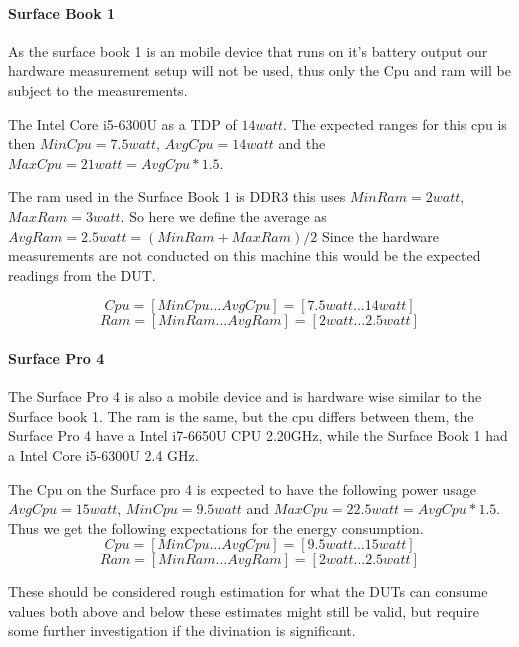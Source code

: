 \paragraph{Surface Book 1}
As the surface book 1 is an mobile device that runs on it's battery output our hardware measurement setup will not be used, thus only the Cpu and ram will be subject to the measurements.

The Intel Core i5-6300U as a TDP of $14 watt$. The expected ranges for this cpu is then $MinCpu = 7.5 watt$, $AvgCpu = 14 watt$ and the $MaxCpu = 21 watt = AvgCpu*1.5$.

The ram used in the Surface Book 1 is DDR3 this uses $MinRam = 2 watt$, $MaxRam = 3 watt$. So here we define the average as $AvgRam =2.5 watt= (MinRam+MaxRam)/2$
Since the hardware measurements are not conducted on this machine this would be the expected readings from the DUT.

$$Cpu = [MinCpu \dotsc AvgCpu] = [7.5 watt \dotsc 14 watt]$$
$$Ram = [MinRam \dotsc AvgRam] = [2 watt \dotsc 2.5 watt]$$

\paragraph{Surface Pro 4}

The Surface Pro 4 is also a mobile device and is hardware wise similar to the Surface book 1. The ram is the same, but the cpu differs between them, the Surface Pro 4 have a Intel i7-6650U CPU 2.20GHz, while the Surface Book 1 had a Intel Core i5-6300U 2.4 GHz.

The Cpu on the Surface pro 4 is expected to have the following power usage $AvgCpu = 15 watt$, $MinCpu = 9.5 watt$ and $MaxCpu = 22.5 watt = AvgCpu*1.5$. Thus we get the following expectations for the energy consumption.
$$Cpu = [MinCpu \dotsc AvgCpu] = [9.5 watt \dotsc 15 watt]$$
$$Ram = [MinRam \dotsc AvgRam] = [2 watt \dotsc 2.5 watt]$$

These should be considered rough estimation for what the DUTs can consume values both above and below these estimates might still be valid, but require some further investigation if the divination is significant. 